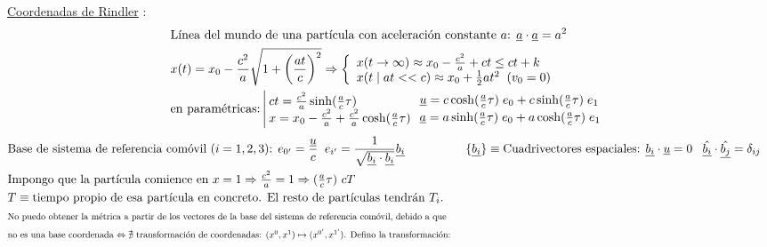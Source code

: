 \underline{Coordenadas de Rindler} : 
\begin{align*}
    &\text{Línea del mundo de una partícula con aceleración constante $a$: } \underline{a}\cdot \underline{a} = a^2\\
    &x(t)=x_0 - \frac{c^2 }{a}\sqrt{1+\left(\frac{at}{c}\right)^2} \Rightarrow 
    \left\{
\begin{array}{l}
x(t\rightarrow\infty)\approx x_0 - \tfrac{c^2}{a}+ct\leq ct+k\\
x(t \;| \; at<<c) \approx x_0 + \frac{1}{2}at^2 \;\; (v_0=0)
\end{array}
\right. \\
&\text{en paramétricas:}\left|\hspace{-3pt}
\begin{array}{l}
ct=\frac{c^2}{a}\sinh(\tfrac{a}{c}\tau)\\
x=x_0-\frac{c^2}{a}+\frac{c^2}{a} \cosh(\tfrac{a}{c}\tau)
\end{array}
\right.
\hspace{-7pt}
\left.
\begin{array}{l}
\underline{u}=c\cosh(\frac{a}{c}\tau) \; e_0 + c\sinh(\frac{a}{c}\tau)\; e_1\vspace{2pt} \\
\underline{a}=a\sinh(\frac{a}{c}\tau)\;e_0+a \cosh (\frac{a}{c}\tau)\; e_1
\end{array}
\right.
\end{align*}
\begin{align*}
&\text{Base de sistema de referencia comóvil ($i=1,2,3$): }
e_{0'}=\frac{\underline{u}}{c} \;\;
e_{i'}=\frac{1}{\sqrt{\underline{b_i}\cdot\underline{b_i}}}\underline{b_i}
&\{\underline{b_i}\}\equiv \text{Cuadrivectores espaciales: }  \underline{b_i}\cdot\underline{u} =0\; \;\; \hat{\underline{b_i}}\cdot\hat{\underline{b_j}} = \delta_{ij}\;\;\;
\\
&\text{Impongo que la partícula comience en } x=1\Rightarrow \tfrac{c^2}{a}=1 \Rightarrow (\tfrac{a}{c}\tau) \ cT
\\
&T\equiv\text{tiempo propio de esa partícula en concreto. El resto de partículas tendrán $T_i$.}\\
&\scalebox{0.75}{\text{No puedo obtener la métrica a partir de los vectores de la base del sistema de referencia comóvil, debido a que}}\\
&\scalebox{0.75}{\text{no es una base coordenada $\Leftrightarrow \nexists$ transformación de coordenadas: $(x^0,x^1)\mapsto (x^{0'},x^{1'})$. Defino la transformación:} }
\end{align*}
